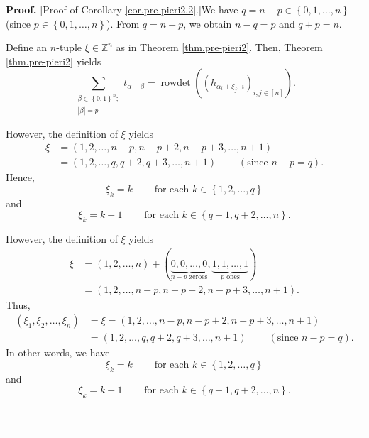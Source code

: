 \documentclass
[numbers=enddot,12pt,final,onecolumn,notitlepage,english]{scrartcl}%
\theoremstyle{definition}
\newenvironment{proof}[1][Proof]{\noindent\textbf{#1.} }{\ \rule{0.5em}{0.5em}}
\let\sumnonlimits\sum
\renewcommand{\sum}{\sumnonlimits\limits}
\newenvironment{verlong}{}{}
\newenvironment{vershort}{}{}
\begin{document}
\begin{proof}
[Proof of Corollary \ref{cor.pre-pieri2.2}.]We have $q=n-p\in\left\{
0,1,\ldots,n\right\}  $ (since $p\in\left\{  0,1,\ldots,n\right\}  $). From
$q=n-p$, we obtain $n-q=p$ and $q+p=n$.

Define an $n$-tuple $\xi\in\mathbb{Z}^{n}$ as in Theorem \ref{thm.pre-pieri2}.
Then, Theorem \ref{thm.pre-pieri2} yields%
\begin{equation}
\sum_{\substack{\beta\in\left\{  0,1\right\}  ^{n};\\\left\vert \beta
\right\vert =p}}t_{\alpha+\beta}=\operatorname*{rowdet}\left(  \left(
h_{\alpha_{i}+\xi_{j},\ i}\right)  _{i,j\in\left[  n\right]  }\right)  .
\label{pf.cor.pre-pieri2.2.1}%
\end{equation}


\begin{vershort}
However, the definition of $\xi$ yields%
\begin{align*}
\xi &  =\left(  1,2,\ldots,n-p,n-p+2,n-p+3,\ldots,n+1\right) \\
&  =\left(  1,2,\ldots,q,q+2,q+3,\ldots,n+1\right)
\ \ \ \ \ \ \ \ \ \ \left(  \text{since }n-p=q\right)  .
\end{align*}
Hence,
\begin{equation}
\xi_{k}=k\ \ \ \ \ \ \ \ \ \ \text{for each }k\in\left\{  1,2,\ldots
,q\right\}  \label{pf.cor.pre-pieri2.2.short.fn2.1}%
\end{equation}
and%
\begin{equation}
\xi_{k}=k+1\ \ \ \ \ \ \ \ \ \ \text{for each }k\in\left\{  q+1,q+2,\ldots
,n\right\}  . \label{pf.cor.pre-pieri2.2.short.fn2.2}%
\end{equation}

\end{vershort}

\begin{verlong}
However, the definition of $\xi$ yields%
\begin{align*}
\xi &  =\left(  1,2,\ldots,n\right)  +\left(  \underbrace{0,0,\ldots
,0}_{n-p\text{ zeroes}},\underbrace{1,1,\ldots,1}_{p\text{ ones}}\right) \\
&  =\left(  1,2,\ldots,n-p,n-p+2,n-p+3,\ldots,n+1\right)  .
\end{align*}
Thus,
\begin{align*}
\left(  \xi_{1},\xi_{2},\ldots,\xi_{n}\right)   &  =\xi=\left(  1,2,\ldots
,n-p,n-p+2,n-p+3,\ldots,n+1\right) \\
&  =\left(  1,2,\ldots,q,q+2,q+3,\ldots,n+1\right)
\ \ \ \ \ \ \ \ \ \ \left(  \text{since }n-p=q\right)  .
\end{align*}
In other words, we have%
\begin{equation}
\xi_{k}=k\ \ \ \ \ \ \ \ \ \ \text{for each }k\in\left\{  1,2,\ldots
,q\right\}  \label{pf.cor.pre-pieri2.2.fn2.1}%
\end{equation}
and%
\begin{equation}
\xi_{k}=k+1\ \ \ \ \ \ \ \ \ \ \text{for each }k\in\left\{  q+1,q+2,\ldots
,n\right\}  . \label{pf.cor.pre-pieri2.2.fn2.2}%
\end{equation}


\end{verlong}
\end{proof}
\end{document}
